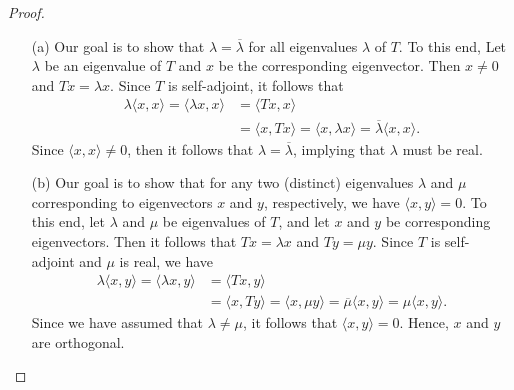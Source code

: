 \begin{proof}
\begin{enumerate}
    \item[(a)] Our goal is to show that \( \lambda = \overline{\lambda} \) for all eigenvalues \( \lambda  \) of \( T  \). To this end, Let \( \lambda  \) be an eigenvalue of \( T  \) and \( x  \) be the corresponding eigenvector. Then \( x \neq 0  \) and \( Tx = \lambda x  \). Since \( T  \) is self-adjoint, it follows that 
        \begin{align*}
            \lambda \langle x  ,  x  \rangle = \langle \lambda x  ,  x  \rangle &= \langle Tx  ,  x  \rangle    \\
                                                                                &= \langle x  ,  Tx  \rangle = \langle x  , \lambda x  \rangle = \overline{\lambda} \langle x  ,  x  \rangle.
        \end{align*}
        Since \( \langle x  ,  x  \rangle \neq 0  \), then it follows that \( \lambda = \overline{\lambda} \), implying that \( \lambda  \) must be real.
    \item[(b)] Our goal is to show that for any two (distinct) eigenvalues \( \lambda  \) and \( \mu  \) corresponding to eigenvectors \(  x \) and \( y  \), respectively, we have \( \langle x , y \rangle = 0  \). To this end, let \(\lambda \) and \( \mu  \) be eigenvalues of \( T  \), and let \( x  \) and \( y  \) be corresponding eigenvectors. Then it follows that \( Tx = \lambda x  \) and \( T  y = \mu y   \). Since \( T  \) is self-adjoint and \( \mu  \) is real, we have  
        \begin{align*}
            \lambda \langle  x  , y \rangle = \langle \lambda x  , y \rangle &= \langle Tx  , y \rangle \\
                                                                             &= \langle x  ,  Ty \rangle = \langle x  ,  \mu y  \rangle = \overline{\mu} \langle x , y \rangle = \mu \langle x  , y \rangle.
        \end{align*}
        Since we have assumed that \( \lambda \neq \mu \), it follows that \( \langle x , y  \rangle = 0  \). Hence, \( x  \) and \( y  \) are orthogonal.
\end{enumerate}
\end{proof}


